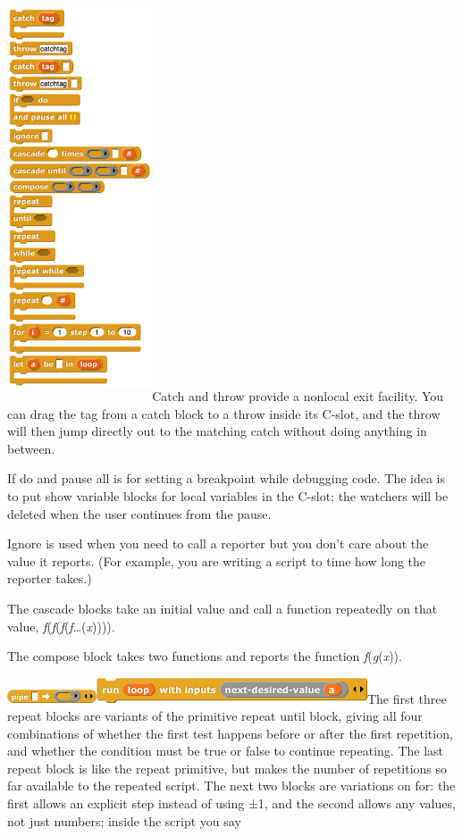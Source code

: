 \includegraphics[width=1.68889in,height=4.75in]{media/image388.png}Catch
and throw provide a nonlocal exit facility. You can drag the tag from a
catch block to a throw inside its C-slot, and the throw will then jump
directly out to the matching catch without doing anything in between.

If do and pause all is for setting a breakpoint while debugging code.
The idea is to put show variable blocks for local variables in the
C-slot; the watchers will be deleted when the user continues from the
pause.

Ignore is used when you need to call a reporter but you don't care about
the value it reports. (For example, you are writing a script to time how
long the reporter takes.)

The cascade blocks take an initial value and call a function repeatedly
on that value, \emph{f}(\emph{f}(\emph{f}(\emph{f}\ldots(\emph{x})))).

The compose block takes two functions and reports the function
\emph{f}(\emph{g}(\emph{x})).

\includegraphics[width=1.04444in,height=0.16111in]{media/image389.png}\includegraphics[width=3.15278in,height=0.29861in]{media/image390.png}The
first three repeat blocks are variants of the primitive repeat until
block, giving all four combinations of whether the first test happens
before or after the first repetition, and whether the condition must be
true or false to continue repeating. The last repeat block is like the
repeat primitive, but makes the number of repetitions so far available
to the repeated script. The next two blocks are variations on for: the
first allows an explicit step instead of using ±1, and the second allows
any values, not just numbers; inside the script you say

